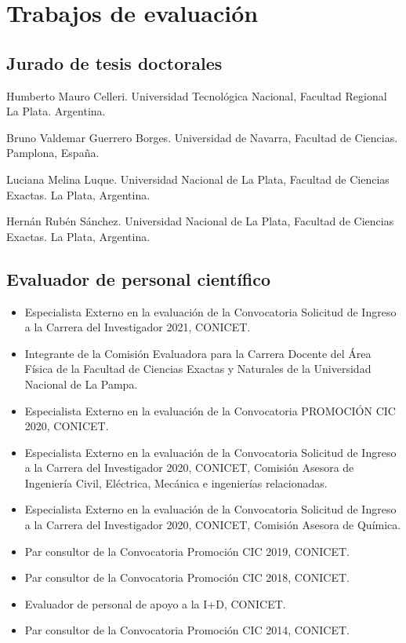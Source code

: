 \section{Trabajos de evaluación}

\subsection{Jurado de tesis doctorales}

 Humberto Mauro Celleri. Universidad Tecnológica Nacional, Facultad Regional La Plata. Argentina.

 Bruno Valdemar Guerrero Borges. Universidad de Navarra, Facultad de Ciencias. Pamplona, España.

 Luciana Melina Luque. Universidad Nacional de La Plata, Facultad de Ciencias Exactas. La Plata, Argentina.

 Hernán Rubén Sánchez. Universidad Nacional de La Plata, Facultad de Ciencias Exactas. La Plata, Argentina.



\subsection{Evaluador de personal científico}

\begin{itemize} \setlength\itemsep{-0.25em}
    \item {} Especialista Externo en la evaluación de la Convocatoria Solicitud de Ingreso a la Carrera del Investigador 2021, CONICET.
    \item {} Integrante de la Comisión Evaluadora para la Carrera Docente del Área Física de la Facultad de Ciencias Exactas y Naturales de la Universidad Nacional de La Pampa.
    \item Especialista Externo en la evaluación de la Convocatoria PROMOCIÓN CIC 2020, CONICET.
    \item {} Especialista Externo en la evaluación de la Convocatoria Solicitud de Ingreso a la Carrera del Investigador 2020, CONICET, Comisión Asesora de Ingeniería Civil, Eléctrica, Mecánica e ingenierías relacionadas.
    \item Especialista Externo en la evaluación de la Convocatoria Solicitud de Ingreso a la Carrera del Investigador 2020, CONICET, Comisión Asesora de Química.
    \item {} Par consultor de la Convocatoria Promoción CIC 2019, CONICET.
    \item {} Par consultor de la Convocatoria Promoción CIC 2018, CONICET.
    \item {} Evaluador de personal de apoyo a la I+D, CONICET.
    \item {} Par consultor de la Convocatoria Promoción CIC 2014, CONICET.
\end{itemize}


